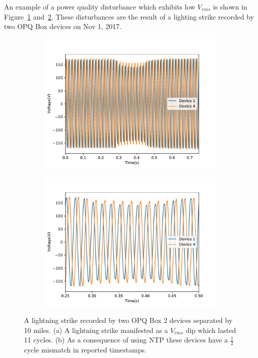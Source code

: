 An example of a power quality disturbance which exhibits low $V_{rms}$ is shown in Figure~\ref{fig:opq:6:1} and~\ref{fig:opq:6:2}.
These disturbances are the result of a lighting strike recorded by two OPQ Box devices on Nov 1, 2017.

\begin{figure}[ht]
		\centering
	\begin{subfigure}{.5\textwidth}
	  \centering
	  \includegraphics[width=0.9\linewidth]{images/opq-box/voltage_sag.pdf}
	  \caption{}
	  \label{fig:opq:6:1}
	\end{subfigure}%
	\begin{subfigure}{.5\textwidth}
	  \centering
	  \includegraphics[width=0.9\linewidth]{images/opq-box/voltage_sag_zoomed_in.pdf}
	  \caption{}
	  \label{fig:opq:6:2}
	\end{subfigure}
	\caption{A lightning strike recorded by two OPQ Box 2 devices separated by 10 miles. (a) A lightning strike manifested as a $V_{rms}$ dip which lasted 11 cycles. (b) As a consequence of using NTP these devices have a $\frac{1}{2}$ cycle mismatch in reported timestamps.}
	\label{fig:opq:6}
\end{figure}


